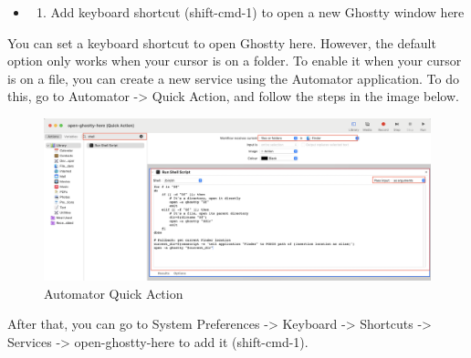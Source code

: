 \documentclass[
  letterpaper,
  DIV=11,
  numbers=noendperiod]{scrartcl}
\providecommand{\tightlist}{%
  \setlength{\itemsep}{0pt}\setlength{\parskip}{0pt}}\usepackage{longtable,booktabs,array}
\begin{document}
\begin{itemize}
\tightlist
\item
  \begin{enumerate}
  \def\labelenumi{(\arabic{enumi})}
  \setcounter{enumi}{2}
  \tightlist
  \item
    Add keyboard shortcut (shift-cmd-1) to open a new Ghostty window
    here
  \end{enumerate}
\end{itemize}

You can set a keyboard shortcut to open Ghostty here. However, the
default option only works when your cursor is on a folder. To enable it
when your cursor is on a file, you can create a new service using the
Automator application. To do this, go to Automator -\textgreater{} Quick
Action, and follow the steps in the image below.

\begin{figure}[H]

{\centering \includegraphics{./images/automator-quick-action.png}

}

\caption{Automator Quick Action}

\end{figure}%

After that, you can go to System Preferences -\textgreater{} Keyboard
-\textgreater{} Shortcuts -\textgreater{} Services -\textgreater{}
open-ghostty-here to add it (shift-cmd-1).
\end{document}

